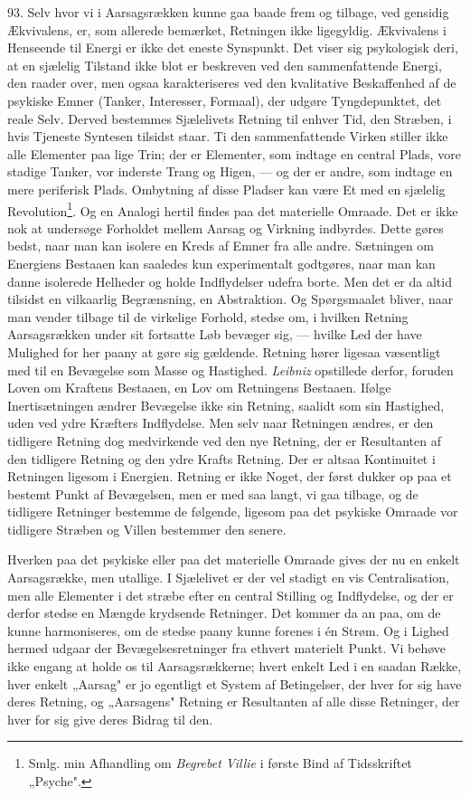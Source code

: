 \documentclass[12pt,a4paper]{book}
\newcommand{\opage}[1]{\marginnote{\footnotesize\textit{[#1]}}}
\begin{document}
93. Selv hvor vi i Aarsagsrækken kunne gaa baade frem og tilbage, ved gensidig
Ækvivalens, er, som allerede bemærket, Retningen ikke ligegyldig. Ækvivalens i
Henseende til Energi er ikke det eneste Synspunkt. Det viser sig psykologisk deri,
at en sjælelig Tilstand ikke blot er beskreven ved den sammenfattende Energi, den
raader over, men ogsaa karakteriseres ved den kvalitative Beskaffenhed af de
psykiske Emner (Tanker, Interesser, Formaal), der udgøre Tyngdepunktet, det reale
Selv. Derved bestemmes Sjælelivets Retning til enhver Tid, den Stræben, i hvis
Tjeneste Syntesen tilsidst staar. Ti den sammenfattende Virken stiller ikke alle
Elementer paa lige Trin; der er Elementer, som indtage en central Plads, vore
stadige Tanker, vor inderste Trang og Higen, --- og der er andre, som indtage en
mere periferisk Plads. Ombytning af disse Pladser kan være Et med en sjælelig
Revolution\footnote{Smlg. min Afhandling om \emph{Begrebet Villie} i første Bind af
Tidsskriftet „Psyche".}. Og en Analogi hertil findes paa det materielle Omraade.
Det er ikke nok at undersøge Forholdet mellem Aarsag og Virkning indbyrdes. Dette
gøres bedst, naar man kan isolere en Kreds af Emner fra alle andre. Sætningen om
Energiens Bestaaen kan saaledes kun experimentalt godtgøres, naar man kan danne
isolerede Helheder og holde Indflydelser udefra borte. Men det er da altid tilsidst
en vilkaarlig Begrænsning, en Abstraktion. Og Spørgsmaalet bliver, naar man vender
tilbage til de virkelige Forhold, stedse om, i hvilken Retning Aarsagsrækken under
sit fortsatte Løb bevæger sig, --- hvilke Led der have Mulighed for her paany at
gøre sig gældende. Retning hører lige\opage{219}saa væsentligt med til en Bevægelse som Masse
og Hastighed. \emph{Leibniz} opstillede derfor, foruden Loven om Kraftens Bestaaen, en Lov om
Retningens Bestaaen. Ifølge Inertisætningen ændrer Bevægelse ikke sin Retning,
saalidt som sin Hastighed, uden ved ydre Kræfters Indflydelse. Men selv naar
Retningen ændres, er den tidligere Retning dog medvirkende ved den nye Retning, der
er Resultanten af den tidligere Retning og den ydre Krafts Retning. Der er altsaa
Kontinuitet i Retningen ligesom i Energien. Retning er ikke Noget, der først dukker
op paa et bestemt Punkt af Bevægelsen, men er med saa langt, vi gaa tilbage, og de
tidligere Retninger bestemme de følgende, ligesom paa det psykiske Omraade vor
tidligere Stræben og Villen bestemmer den senere.

Hverken paa det psykiske eller paa det materielle Omraade gives der nu en enkelt
Aarsagsrække, men utallige. I Sjælelivet er der vel stadigt en vis Centralisation,
men alle Elementer i det stræbe efter en central Stilling og Indflydelse, og der er
derfor stedse en Mængde krydsende Retninger. Det kommer da an paa, om de kunne
harmoniseres, om de stedse paany kunne forenes i én Strøm. Og i Lighed hermed
udgaar der Bevægelsesretninger fra ethvert materielt Punkt. Vi behøve ikke engang
at holde os til Aarsagsrækkerne; hvert enkelt Led i en saadan Række, hver enkelt
„Aarsag" er jo egentligt et System af Betingelser, der hver for sig have deres
Retning, og „Aarsagens" Retning er Resultanten af alle disse Retninger, der hver
for sig give deres Bidrag til den.
\end{document}
